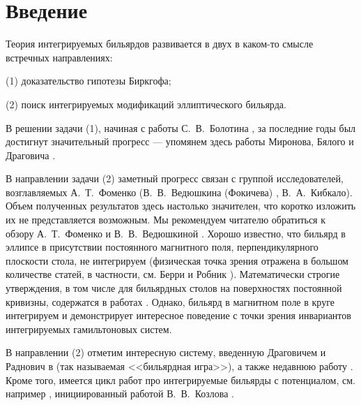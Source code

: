 \section{Введение}\label{s1}
Теория интегрируемых бильярдов развивается в двух в каком-то смысле встречных направлениях:

(1) доказательство гипотезы Биркгофа; 

(2) поиск интегрируемых модификаций эллиптического бильярда.

В решении задачи (1), начиная с работы С.~В.~Болотина \cite{Bol90}, за последние годы был достигнут значительный прогресс --- упомянем здесь работы Миронова, Бялого и Драговича \cite{bm2022, bm2024}.

В направлении задачи (2) заметный прогресс связан с группой исследователей, возглавляемых А.~Т.~Фоменко (В.~В.~Ведюшкина (Фокичева) \cite{Fok15, 1},  В.~А.~Кибкало).
Объем полученных результатов здесь настолько значителен, что коротко изложить их не представляется возможным. Мы рекомендуем читателю обратиться к обзору А.~Т.~Фоменко и В.~В.~Ведюшкиной \cite{fv2023}.
Хорошо известно, что бильярд в эллипсе в присутствии постоянного магнитного поля, перпендикулярного плоскости стола, не интегрируем (физическая точка зрения отражена в большом количестве статей, в частности, см. Берри и Робник \cite{berry1985, berry1986}). 
Математически строгие утверждения, в том числе для бильярдных столов на поверхностях постоянной кривизны,  содержатся в работах \cite{bm2019, zbMATH06661562, bm2020}.
Однако, бильярд в магнитном поле в круге интегрируем и демонстрирует интересное поведение с точки зрения инвариантов интегрируемых гамильтоновых систем.

В направлении (2) отметим интересную систему, введенную Драговичем и Раднович в \cite{DraGasRad22} (так называемая <<бильярдная игра>>),  а также недавнюю работу \cite{wire}.
Кроме того, имеется цикл работ про интегрируемые бильярды с потенциалом, см. например \cite{Dra1, Dra4}, инициированный работой В.~В.~Козлова \cite{Kozlov}.

\medskip

